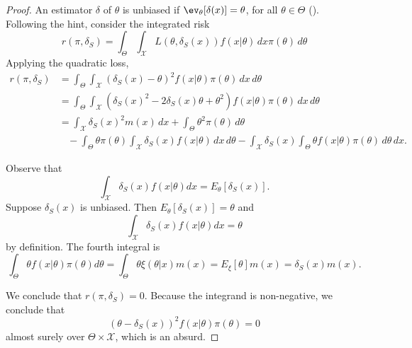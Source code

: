 \begin{proof}
    An estimator $\delta$ of $\theta$ is unbiased if $\ev_{\theta}[\delta(x)] =
    \theta$, for all $\theta \in \Theta$ (\cite{schervish1996theory}).
    Following the hint, consider the integrated risk 
    $$
    r(\pi, \delta_S) = \int_{\Theta}\int_{\mathcal{X}} L(\theta, \delta_S(x)) f(x|\theta) \,dx \pi(\theta) \, d\theta 
    $$
    Applying the quadratic loss,
    \begin{equation*}
        \begin{split}
            r(\pi, \delta_S) &= \int_{\Theta}\int_{\mathcal{X}} (\delta_S(x) - \theta)^2 f(x|\theta)\pi(\theta) \, dx \, d\theta \\
            &= \int_{\Theta}\int_{\mathcal{X}} \left(\delta_S(x)^2 - 2\delta_S(x)\theta + \theta^2\right) f(x|\theta)\pi(\theta) \, dx \, d\theta \\ 
            &= \int_{\mathcal{X}} \delta_S(x)^2 m(x) \, dx + \int_{\Theta} \theta^2 \pi(\theta) \, d\theta \\
            &~~~~- \int_{\Theta} \theta \pi(\theta) \int_{\mathcal{X}} \delta_S(x) f(x|\theta)\, dx \, d\theta - \int_{\mathcal{X}} \delta_S(x) \int_{\Theta} \theta f(x|\theta)\pi(\theta) \, d\theta \, dx. 
        \end{split}
    \end{equation*}

    Observe that 
    $$\int_{\mathcal{X}} \delta_S(x) f(x|\theta)dx =
    E_{\theta}[\delta_S(x)].$$ Suppose $\delta_S(x)$ is unbiased. Then
    $E_{\theta}[\delta_S(x)] = \theta$ and 
    $$
    \int_{\mathcal{X}} \delta_S(x) f(x|\theta)dx = \theta
    $$
    by definition. The fourth integral is 
    $$\int_{\Theta} \theta f(x|\theta)\pi(\theta)d\theta = \int_{\Theta} \theta
    \xi(\theta|x)m(x) = E_{\xi}[\theta]m(x) = \delta_S(x)m(x).$$

    We conclude that $r(\pi, \delta_S) = 0$. Because the integrand is
    non-negative, we conclude that 
    $$
    (\theta - \delta_S(x))^2f(x|\theta)\pi(\theta) = 0
    $$
    almost surely over $\Theta \times \mathcal{X}$, which is an absurd. 

\end{proof}
